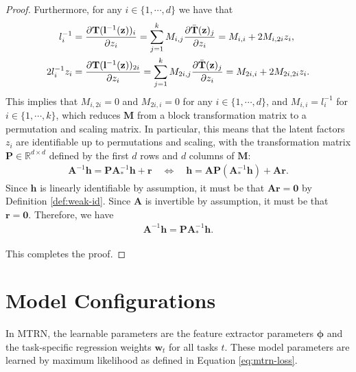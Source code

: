\documentclass{article} %
\theoremstyle{plain}
\theoremstyle{definition}
\theoremstyle{remark}
\begin{document}
\begin{proof}
    Furthermore, for any $i\in\{1,\cdots,d\}$ we have that
    \begin{align}
        l_i^{-1} &= \frac{\partial \mathbf{T}(\mathbf{l}^{-1}(\mathbf{z}))_i}{\partial z_i}=\sum_{j=1}^k M_{i,j}\frac{\partial \Bar{\mathbf{T}}(\mathbf{z})_j}{\partial z_i}=M_{i,i}+2M_{i,2i}z_i,\\
        2l_i^{-1}z_i &= \frac{\partial \mathbf{T}(\mathbf{l}^{-1}(\mathbf{z}))_{2i}}{\partial z_i}=\sum_{j=1}^k M_{2i,j}\frac{\partial \Bar{\mathbf{T}}(\mathbf{z})_j}{\partial z_i}=M_{2i,i}+2M_{2i,2i}z_i.
    \end{align}
    This implies that $M_{i,2i}=0$ and $M_{2i,i}=0$ for any $i\in\{1,\cdots,d\}$, and $M_{i,i}=l_i^{-1}$ for $i\in\{1,\cdots,k\}$, which reduces $\mathbf{M}$ from a block transformation matrix to a permutation and scaling matrix. In particular, this means that the latent factors $z_i$ are identifiable up to permutations and scaling, with the transformation matrix $\mathbf{P}\in\mathbb{R}^{d\times d}$ defined by the first $d$ rows and $d$ columns of $\mathbf{M}$:
    \begin{align}
        \mathbf{A}^{-1}\mathbf{h}=\mathbf{P}\mathbf{A}_*^{-1}\mathbf{h}+\mathbf{r}
        \quad\iff\quad 
        \mathbf{h}=\mathbf{A}\mathbf{P}(\mathbf{A}_*^{-1}\mathbf{h})+\mathbf{A}\mathbf{r}.
    \end{align}
    Since $\mathbf{h}$ is linearly identifiable by assumption, it must be that $\mathbf{A}\mathbf{r}=\mathbf{0}$ by Definition \ref{def:weak-id}. Since $\mathbf{A}$ is invertible by assumption, it must be that $\mathbf{r}=\mathbf{0}$. Therefore, we have
    \begin{align}
         \mathbf{A}^{-1}\mathbf{h}=\mathbf{P}\mathbf{A}_*^{-1}\mathbf{h}.
    \end{align}
    
    This completes the proof.
\end{proof}


\section{Model Configurations}\label{appendix: model-config}
In MTRN, the learnable parameters are the feature extractor parameters $\boldsymbol{\phi}$ and the task-specific regression weights $\mathbf{w}_t$ for all tasks $t$. These model parameters are learned by maximum likelihood as defined in Equation \eqref{eq:mtrn-loss}.
\end{document}
